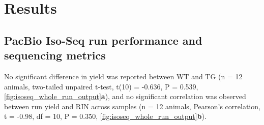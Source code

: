 \clearpage 
\section{Results}



\subsection{PacBio Iso-Seq run performance and sequencing metrics}
No significant difference in yield was reported between WT and TG (n = 12 animals, two-tailed unpaired t-test, t(10) = -0.636, P = 0.539,  \cref{fig:isoseq_whole_run_output}\textbf{a}), and no significant correlation was observed between run yield and RIN across samples (n = 12 animals, Pearson's correlation, t = -0.98, df = 10, P = 0.350, \cref{fig:isoseq_whole_run_output}\textbf{b}).

